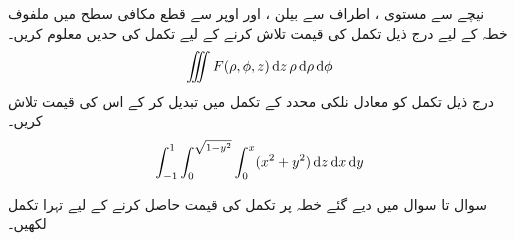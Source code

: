 نیچے سے مستوی ،  اطراف سے بیلن ، اور اوپر سے قطع مکافی سطح  میں ملفوف خطہ  کے لیے درج ذیل تکمل کی قیمت تلاش کرنے کے لیے    تکمل کی  حدیں معلوم کریں۔
\begin{align*}
\iiint F(\rho,\phi,z)\dif z\,\rho \dif \rho\dif\phi
\end{align*}
درج ذیل تکمل کو معادل نلکی محدد کے تکمل میں تبدیل کر   کے اس کی قیمت تلاش کریں۔
\begin{align*}
\int_{-1}^1 \int_0^{\sqrt{1-y^2}}\int_0^x (x^2+y^2)\dif z\dif x\dif y
\end{align*}

سوال  تا سوال   میں دیے گئے خطہ  پر تکمل  کی قیمت حاصل کرنے کے لیے تہرا تکمل لکھیں۔

